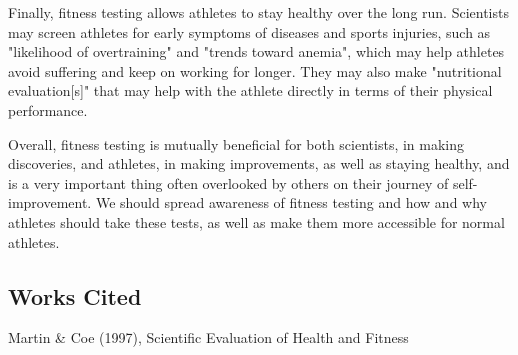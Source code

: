 \documentclass[12pt]{article}
\begin{document}
Finally, fitness testing allows athletes to stay healthy over the long run. Scientists may screen athletes for early symptoms of diseases and sports injuries, such as "likelihood of overtraining" and "trends toward anemia", which may help athletes avoid suffering and keep on working for longer. They may also make "nutritional evaluation[s]" that may help with the athlete directly in terms of their physical performance.

Overall, fitness testing is mutually beneficial for both scientists, in making discoveries, and athletes, in making improvements, as well as staying healthy, and is a very important thing often overlooked by others on their journey of self-improvement. We should spread awareness of fitness testing and how and why athletes should take these tests, as well as make them more accessible for normal athletes.

\subsection*{Works Cited}
Martin \& Coe (1997), Scientific Evaluation of Health and Fitness
\end{document}

